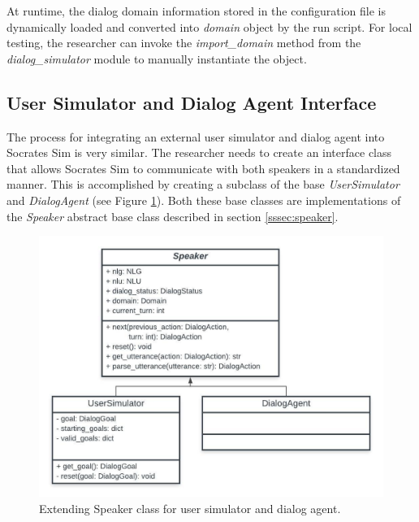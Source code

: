 At runtime, the dialog domain information stored in the configuration file is dynamically loaded and converted into \textit{domain} object by the run script. For local testing, the researcher can invoke the \textit{import\_domain} method from the \textit{dialog\_simulator} module to manually instantiate the object. 

\subsection{User Simulator and Dialog Agent  Interface}
\label{sec:speake_interface}
The process for integrating an external user simulator and dialog agent into Socrates Sim is very similar. The researcher needs to create an interface class that allows Socrates Sim to communicate with both speakers in a standardized manner.  This is accomplished by creating a subclass of the base \textit{UserSimulator} and \textit{DialogAgent} (see Figure \ref{fig:speaker_ext}). Both these base classes are implementations of the \textit{Speaker} abstract base class described in section \ref{sssec:speaker}. 

\begin{figure}[h!]
	\centering
	\includegraphics[scale=.75]{diagrams/speaker_classes.jpeg}
	\caption{ Extending Speaker class for user simulator and dialog agent.} 
	\label{fig:speaker_ext}
\end{figure}

